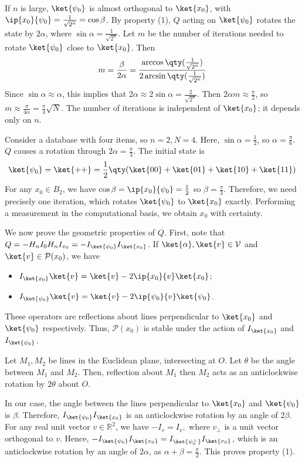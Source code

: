 If $n$ is large, $\ket{\psi_0}$ is almost orthogonal to $\ket{x_0}$, with $\ip{x_0}{\psi_0} = \frac{1}{\sqrt{2^n}} = \cos \beta$.
By property (1), $Q$ acting on $\ket{\psi_0}$ rotates the state by $2\alpha$, where $\sin\alpha = \frac{1}{\sqrt{2^n}}$.
Let $m$ be the number of iterations needed to rotate $\ket{\psi_0}$ close to $\ket{x_0}$.
Then
\[ m = \frac{\beta}{2\alpha} = \frac{\arccos\qty(\frac{1}{\sqrt{2^n}})}{2\arcsin\qty(\frac{1}{\sqrt{2^n}})} \]
Since $\sin \alpha \approx \alpha$, this implies that $2\alpha \approx 2\sin\alpha = \frac{2}{\sqrt{2^n}}$.
Then $2 \alpha m \approx \frac{\pi}{2}$, so $m \approx \frac{\pi}{4\alpha} = \frac{\pi}{4} \sqrt{N}$.
The number of iterations is independent of $\ket{x_0}$; it depends only on $n$.
\begin{example}
    Consider a database with four items, so $n = 2, N = 4$.
    Here, $\sin \alpha = \frac{1}{2}$, so $\alpha = \frac{\pi}{6}$.
    $Q$ causes a rotation through $2\alpha = \frac{\pi}{3}$.
    The initial state is
    \[ \ket{\psi_0} = \ket{++} = \frac{1}{2}\qty(\ket{00} + \ket{01} + \ket{10} + \ket{11}) \]
    For any $x_0 \in B_2$, we have $\cos\beta = \ip{x_0}{\psi_0} = \frac{1}{2}$ so $\beta = \frac{\pi}{3}$.
    Therefore, we need precisely one iteration, which rotates $\ket{\psi_0}$ to $\ket{x_0}$ exactly.
    Performing a measurement in the computational basis, we obtain $x_0$ with certainty.
\end{example}
We now prove the geometric properties of $Q$.
First, note that $Q = -H_n I_0 H_n I_{x_0} = -I_{\ket{\psi_0}} I_{\ket{x_0}}$.
If $\ket{\alpha}, \ket{v} \in \mathcal V$ and $\ket{v} \in \mathcal P(x_0)$, we have
\begin{itemize}
    \item $I_{\ket{x_0}} \ket{v} = \ket{v} - 2\ip{x_0}{v} \ket{x_0}$;
    \item $I_{\ket{\psi_0}} \ket{v} = \ket{v} - 2\ip{\psi_0}{v} \ket{\psi_0}$.
\end{itemize}
These operators are reflections about lines perpendicular to $\ket{x_0}$ and $\ket{\psi_0}$ respectively.
Thus, $\mathcal P(x_0)$ is stable under the action of $I_{\ket{x_0}}$ and $I_{\ket{\psi_0}}$.

Let $M_1, M_2$ be lines in the Euclidean plane, intersecting at $O$.
Let $\theta$ be the angle between $M_1$ and $M_2$.
Then, reflection about $M_1$ then $M_2$ acts as an anticlockwise rotation by $2\theta$ about $O$.

In our case, the angle between the lines perpendicular to $\ket{x_0}$ and $\ket{\psi_0}$ is $\beta$.
Therefore, $I_{\ket{\psi_0}} I_{\ket{x_0}}$ is an anticlockwise rotation by an angle of $2\beta$.
For any real unit vector $v \in \mathbb R^2$, we have $-I_v = I_{v^\perp}$ where $v_\perp$ is a unit vector orthogonal to $v$.
Hence, $-I_{\ket{\psi_0}} I_{\ket{x_0}} = I_{\ket{\psi_0^\perp}} I_{\ket{x_0}}$, which is an anticlockwise rotation by an angle of $2\alpha$, as $\alpha + \beta = \frac{\pi}{2}$.
This proves property (1).

